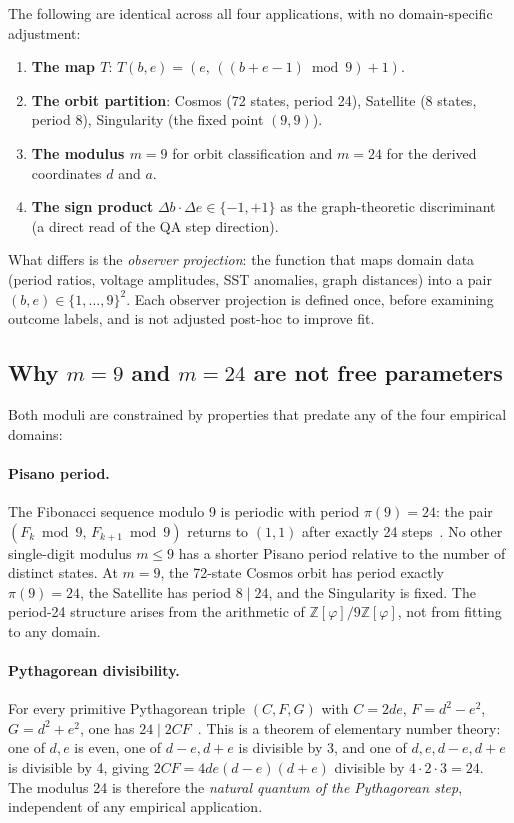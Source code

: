 \documentclass[11pt]{article}
\begin{document}
The following are identical across all four applications, with no domain-specific
adjustment:

\begin{enumerate}[label=(\arabic*)]
  \item \textbf{The map $T$}: $T(b,e) = (e,\, ((b+e-1)\bmod 9)+1)$.
  \item \textbf{The orbit partition}: Cosmos (72 states, period 24),
        Satellite (8 states, period 8), Singularity (the fixed point $(9,9)$).
  \item \textbf{The modulus $m = 9$} for orbit classification
        and $m = 24$ for the derived coordinates $d$ and $a$.
  \item \textbf{The sign product} $\Delta b \cdot \Delta e \in \{-1,+1\}$
        as the graph-theoretic discriminant (a direct read of the QA step direction).
\end{enumerate}

What differs is the \emph{observer projection}: the function that maps
domain data (period ratios, voltage amplitudes, SST anomalies, graph distances)
into a pair $(b,e) \in \{1,\dots,9\}^2$.  Each observer projection is
defined once, before examining outcome labels, and is not adjusted
post-hoc to improve fit.

\subsection{Why $m = 9$ and $m = 24$ are not free parameters}

Both moduli are constrained by properties that predate any of the four
empirical domains:

\paragraph{Pisano period.}
The Fibonacci sequence modulo 9 is periodic with period $\pi(9) = 24$:
the pair $(F_k \bmod 9,\, F_{k+1} \bmod 9)$ returns to $(1,1)$ after exactly
24 steps~\cite{wall1960}.  No other single-digit modulus $m \leq 9$ has a
shorter Pisano period relative to the number of distinct states.
At $m=9$, the 72-state Cosmos orbit has period exactly $\pi(9) = 24$,
the Satellite has period $8 \mid 24$, and the Singularity is fixed.
The period-24 structure arises from the arithmetic of $\mathbb{Z}[\varphi]/9\mathbb{Z}[\varphi]$,
not from fitting to any domain.

\paragraph{Pythagorean divisibility.}
For every primitive Pythagorean triple $(C,F,G)$ with $C = 2de$,
$F = d^2-e^2$, $G = d^2+e^2$, one has $24 \mid 2CF$~\cite{carmichael1910}.
This is a theorem of elementary number theory: one of $d,e$ is even,
one of $d-e, d+e$ is divisible by 3, and one of $d,e,d-e,d+e$ is
divisible by 4, giving $2CF = 4de(d-e)(d+e)$ divisible by
$4 \cdot 2 \cdot 3 = 24$.  The modulus 24 is therefore the
\emph{natural quantum of the Pythagorean step}, independent of any
empirical application.
\end{document}
